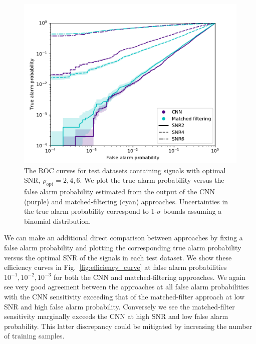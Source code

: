 \documentclass[%
showpacs,
 amsmath,amssymb,
 aps,
 twocolumn,
 prl,
 reprint,
floatfix,
]{revtex4-1}
\begin{document}
%
%
\begin{figure}[]
\includegraphics[width=\columnwidth] {figures/ROC_curves.pdf}
\caption{The \ac{ROC} curves for test datasets containing signals with optimal
\ac{SNR}, $\rho_{\mathrm{opt}}=2,4,6$. We plot the true alarm probability
versus the false alarm probability estimated from the output of the \ac{CNN}
(purple) and matched-filtering (cyan) approaches. Uncertainties in the true
alarm probability correspond to 1-$\sigma$ bounds assuming a binomial
distribution.} \label{fig:ROC_curves} 
\end{figure}

%
%
We can make an additional direct comparison between approaches by fixing a
false alarm probability and plotting the corresponding true alarm probability
versus the optimal \ac{SNR} of the signals in each test dataset. We show these
efficiency curves in Fig.~\ref{fig:efficiency_curve} at false alarm
probabilities $10^{-1},10^{-2},10^{-3}$ for both the \ac{CNN} and
matched-filtering approaches. We again see very good agreement between the
approaches at all false alarm probabilities with the \ac{CNN} sensitivity
exceeding that of the matched-filter approach at low \ac{SNR} and high false
alarm probability. Conversely we see the matched-filter sensitivity marginally
exceeds the \ac{CNN} at high \ac{SNR} and low false alarm probability. This
latter discrepancy could be mitigated by increasing the number of training
samples.

\end{document}
